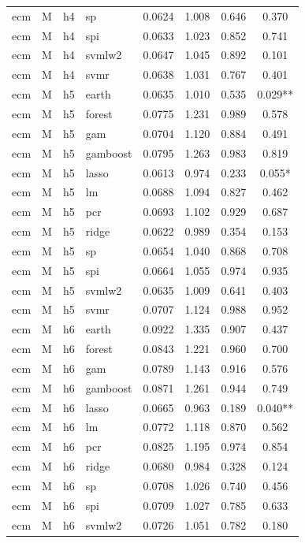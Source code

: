 \begin{ThreePartTable}
\begin{longtable}[t]{llclcccc}
ecm & M & h4 & sp & 0.0624 & 1.008 & 0.646 & 0.370\\
ecm & M & h4 & spi & 0.0633 & 1.023 & 0.852 & 0.741\\
ecm & M & h4 & svmlw2 & 0.0647 & 1.045 & 0.892 & 0.101\\
ecm & M & h4 & svmr & 0.0638 & 1.031 & 0.767 & 0.401\\
\addlinespace
ecm & M & h5 & earth & 0.0635 & 1.010 & 0.535 & 0.029**\\
ecm & M & h5 & forest & 0.0775 & 1.231 & 0.989 & 0.578\\
ecm & M & h5 & gam & 0.0704 & 1.120 & 0.884 & 0.491\\
ecm & M & h5 & gamboost & 0.0795 & 1.263 & 0.983 & 0.819\\
ecm & M & h5 & lasso & 0.0613 & 0.974 & 0.233 & 0.055*\\
ecm & M & h5 & lm & 0.0688 & 1.094 & 0.827 & 0.462\\
ecm & M & h5 & pcr & 0.0693 & 1.102 & 0.929 & 0.687\\
ecm & M & h5 & ridge & 0.0622 & 0.989 & 0.354 & 0.153\\
ecm & M & h5 & sp & 0.0654 & 1.040 & 0.868 & 0.708\\
ecm & M & h5 & spi & 0.0664 & 1.055 & 0.974 & 0.935\\
ecm & M & h5 & svmlw2 & 0.0635 & 1.009 & 0.641 & 0.403\\
ecm & M & h5 & svmr & 0.0707 & 1.124 & 0.988 & 0.952\\
\addlinespace
ecm & M & h6 & earth & 0.0922 & 1.335 & 0.907 & 0.437\\
ecm & M & h6 & forest & 0.0843 & 1.221 & 0.960 & 0.700\\
ecm & M & h6 & gam & 0.0789 & 1.143 & 0.916 & 0.576\\
ecm & M & h6 & gamboost & 0.0871 & 1.261 & 0.944 & 0.749\\
ecm & M & h6 & lasso & 0.0665 & 0.963 & 0.189 & 0.040**\\
ecm & M & h6 & lm & 0.0772 & 1.118 & 0.870 & 0.562\\
ecm & M & h6 & pcr & 0.0825 & 1.195 & 0.974 & 0.854\\
ecm & M & h6 & ridge & 0.0680 & 0.984 & 0.328 & 0.124\\
ecm & M & h6 & sp & 0.0708 & 1.026 & 0.740 & 0.456\\
ecm & M & h6 & spi & 0.0709 & 1.027 & 0.785 & 0.633\\
ecm & M & h6 & svmlw2 & 0.0726 & 1.051 & 0.782 & 0.180\\

\end{longtable}
\end{ThreePartTable}
